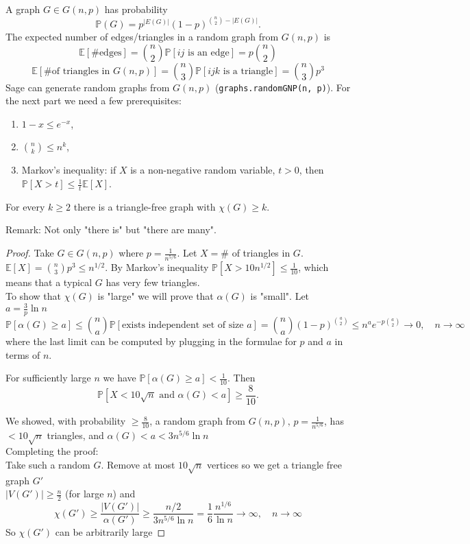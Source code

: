 A graph $G \in G(n,p)$ has probability
$$
\mathbb{P}(G)=p^{|E(G)|}(1-p)^{\binom{n}{2}-|E(G)|}.
$$
The expected number of edges/triangles in a random graph from $G(n,p)$ is
$$
\mathbb{E}[\# \text{edges}]=\binom{n}{2}\mathbb{P}[ij \text{ is an edge}]=p\binom{n}{2}
$$
$$
\mathbb{E}[\# \text{of triangles in } G(n,p)]=\binom{n}{3}\mathbb{P}[ijk \text{ is a triangle}]=\binom{n}{3}p^3
$$
Sage can generate random graphs from $G(n,p)$ (\texttt{graphs.randomGNP(n, p)}). 
For the next part we need a few prerequisites:
\begin{enumerate}
	\item $1-x \leq e^{-x}$,
	\item $\binom{n}{k} \leq n^k$,
	\item Markov's inequality: if $X$ is a non-negative random variable, $t>0$, then $\mathbb{P}[X>t]\leq \frac{1}{t}\mathbb{E}[X]$.
\end{enumerate}
\begin{theorem} For every $k\geq 2$  there is a triangle-free graph with $\chi(G)\geq k$.
\end{theorem}
Remark: Not only "there is" but "there are many".
\begin{proof}
Take $G \in G(n,p)$ where $p=\frac{1}{n^{5/6}}$. Let $X=\#$ of triangles in $G$. \\
$\mathbb{E}[X]=\binom{n}{3}p^3 \leq n^{1/2}$. By Markov's inequality $\mathbb{P}[X>10n^{1/2}]\leq \frac{1}{10}$, which means that a typical $G$ has very few triangles. \\
To show that $\chi(G)$ is "large" we will prove that $\alpha(G)$ is "small". Let $a=\frac{3}{p}\ln{n}$ 
$$
\mathbb{P}[\alpha(G)\geq a] \leq \binom{n}{a}\mathbb{P}[\text{exists independent set of size }a] = \binom{n}{a}(1-p)^{\binom{a}{2}} \leq n^ae^{-p\binom{a}{2}} \rightarrow 0,\quad n\rightarrow \infty
$$
where the last limit can be computed by plugging in the formulae for $p$ and $a$ in terms of $n$.

For sufficiently large $n$ we have $\mathbb{P}[\alpha(G)\geq a]<\frac{1}{10}$. Then $$\mathbb{P}[X<10\sqrt{n} \text{ and } \alpha(G)<a] \geq \frac{8}{10}.$$

We showed, with probability $\geq \frac{8}{10}$, a random graph from $G(n,p), \, p=\frac{1}{n^{5/6}}$, has $<10\sqrt{n}$ triangles, and $\alpha(G)<a<3n^{5/6}\ln{n}$ \\
Completing the proof: \\
Take such a random $G$. Remove at most $10\sqrt{n}$ vertices so we get a triangle free graph $G'$ \\
$|V(G')| \geq \frac{n}{2}$ (for large $n$) and 
$$
\chi(G')\geq \frac{|V(G')|}{\alpha(G')} \geq \frac{n/2}{3n^{5/6}\ln{n}}=\frac{1}{6}\frac{n^{1/6}}{\ln{n}}\rightarrow \infty, \quad n\rightarrow \infty
$$
So $\chi(G')$ can be arbitrarily large
\end{proof}


